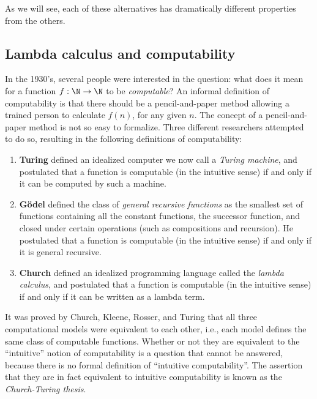\documentclass[12pt]{article}
\begin{document}
As we will see, each of these alternatives has dramatically different
properties from the others.

\subsection{Lambda calculus and computability}

In the 1930's, several people were interested in the question: what
does it mean for a function $f:\N\to\N$ to be {\em computable}? An
informal definition of computability is that there should be a
pencil-and-paper method allowing a trained person to calculate $f(n)$,
for any given $n$. The concept of a pencil-and-paper method is not so
easy to formalize. Three different researchers attempted to do so,
resulting in the following definitions of computability:

\begin{enumerate}
\item {\bf Turing} defined an idealized computer we now call a {\em
    Turing machine}, and postulated that a function is computable (in
  the intuitive sense) if and only if it can be computed by such a
  machine.
\item {\bf G\"odel} defined the class of {\em general recursive
    functions} as the smallest set of functions containing all the
  constant functions, the successor function, and closed under certain
  operations (such as compositions and recursion). He postulated that
    a function is computable (in the intuitive sense) if and only if
    it is general recursive.
\item {\bf Church} defined an idealized programming language called
  the {\em lambda calculus}, and postulated that a function is
  computable (in the intuitive sense) if and only if it can be
  written as a lambda term.
\end{enumerate}

It was proved by Church, Kleene, Rosser, and Turing that all three
computational models were equivalent to each other, i.e., each model
defines the same class of computable functions. Whether or not they
are equivalent to the ``intuitive'' notion of computability is a
question that cannot be answered, because there is no formal
definition of ``intuitive computability''. The assertion that they are
in fact equivalent to intuitive computability is known as the {\em
  Church-Turing thesis}.

\end{document}
